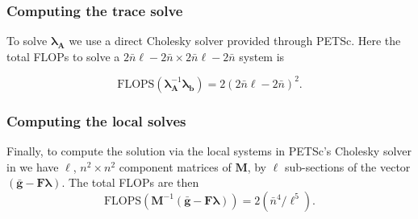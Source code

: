 %
%
%
\subsubsection{Computing the trace solve}

%
%
%
To solve $\symbf{\lambda}_{\textbf{A}}$ we use a direct Cholesky solver provided through PETSc. 
Here the total FLOPs to solve a $2\bar{n}\ell - 2\bar{n} \times 2\bar{n}\ell - 2\bar{n}$ system is 

\begin{equation}
	\text{FLOPS}(\symbf{\lambda}_{\textbf{A}}^{-1}\symbf{\lambda}_{\textbf{b}}) = 2  (2\bar{n}\ell - 2\bar{n})^2.
\end{equation}

%
%
%
\subsubsection{Computing the local solves}

%
%
%
Finally, to compute the solution via the local systems in PETSc's Cholesky solver in  we have $\ell$, $n^2 \times n^2$ component matrices of $\textbf{M}$, by $\ell$ sub-sections of the vector $(\bar{\textbf{g}} - \textbf{F} \symbf{\lambda})$. 
The total FLOPs are then 
\begin{equation}
	\text{FLOPS}(\textbf{M}^{-1}(\bar{\textbf{g}} - \textbf{F} \symbf{\lambda})) = 2 (\bar{n}^4/\ell^5).
\end{equation}

%






